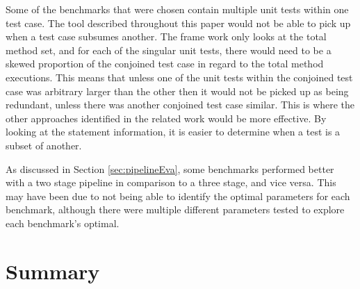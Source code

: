 Some of the benchmarks that were chosen contain multiple unit tests within one test case. The tool described throughout this paper would not be able to pick up when a test case subsumes another. The frame work only looks at the total method set, and for each of the singular unit tests, there would need to be a skewed proportion of the conjoined test case in regard to the total method executions. This means that unless one of the unit tests within the conjoined test case was arbitrary larger than the other then it would not be picked up as being redundant, unless there was another conjoined test case similar. This is where the other approaches identified in the related work would be more effective. By looking at the statement information, it is easier to determine when a test is a subset of another.

As discussed in Section \ref{sec:pipelineEva}, some benchmarks performed better with a two stage pipeline in comparison to a three stage, and vice versa. This may have been due to not being able to identify the optimal parameters for each benchmark, although there were multiple different parameters tested to explore each benchmark's optimal. 


\section{Summary}


